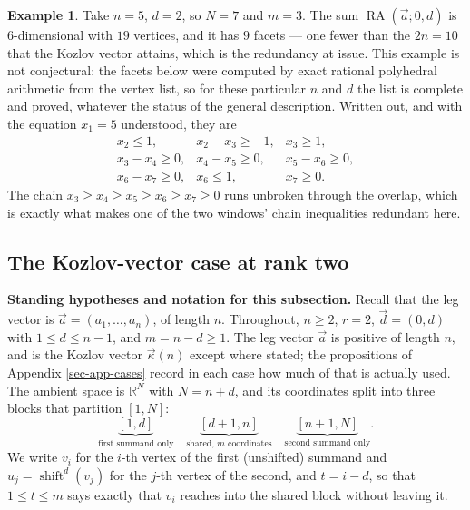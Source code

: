 \documentclass[11pt, a4paper, abstract=yes]{scrartcl}
\theoremstyle{definition}
\newtheorem{mexample}[definition]{Example}
\theoremstyle{remark}
\theoremstyle{plain}
\newcommand{\shift}{\operatorname{shift}}
\newcommand{\RA}{\operatorname{RA}}
\newcommand{\kozvec}{\vec\kappa}
\begin{document}
\begin{mexample}
Take \(n=5\), \(d=2\), so \(N=7\) and \(m=3\). The sum \(\RA(\vec a;0,d)\) is \(6\)-dimensional
with \(19\)
vertices, and it has \(9\) facets --- one fewer than the \(2n=10\) that the Kozlov vector attains,
which is the redundancy at issue. This example is not conjectural: the facets below were computed
by exact rational polyhedral arithmetic from the vertex list, so for these particular \(n\) and
\(d\) the list is complete and proved, whatever the status of the general description. Written out,
and with the equation \(x_1=5\) understood, they are
\[
\begin{array}{lll}
 x_2\le 1, & x_2-x_3\ge-1, & x_3\ge 1,\\
 x_3-x_4\ge 0, & x_4-x_5\ge 0, & x_5-x_6\ge 0,\\
 x_6-x_7\ge 0, & x_6\le 1, & x_7\ge 0 .
\end{array}
\]
The chain \(x_3\ge x_4\ge x_5\ge x_6\ge x_7\ge0\) runs unbroken through the overlap, which is
exactly what makes one of the two windows' chain inequalities redundant here.
\label{ex-ones-facets}
\end{mexample}
\subsection{The Kozlov-vector case at rank two}
\label{sec:orge0f18c1}

\textbf{Standing hypotheses and notation for this subsection.} Recall that the leg vector is
\(\vec a=(a_1,\dots,a_n)\), of length \(n\). Throughout, \(n\ge2\), \(r=2\),
\(\vec d=(0,d)\) with \(1\le d\le n-1\), and \(m=n-d\ge1\). The leg vector \(\vec a\) is positive of
length \(n\), and is the Kozlov vector \(\kozvec(n)\) except where stated; the propositions of
Appendix \ref{sec-app-cases} record in each case how much of that is actually used. The
ambient space is \(\mathbb R^N\) with \(N=n+d\), and its coordinates split into three blocks that
partition \([1,N]\):
\begin{equation}\label{eq:ones-facets}
  \underbrace{[1,d]}_{\text{first summand only}}\quad
  \underbrace{[d+1,n]}_{\text{shared, }m\text{ coordinates}}\quad
  \underbrace{[n+1,N]}_{\text{second summand only}} .
\end{equation}
We write \(v_i\) for the \(i\)-th vertex of the first (unshifted) summand and
\(u_j=\shift^d(v_j)\) for the \(j\)-th vertex of the second, and \(t=i-d\), so that
\(1\le t\le m\) says exactly that \(v_i\) reaches into the shared block without leaving it.
\end{document}

